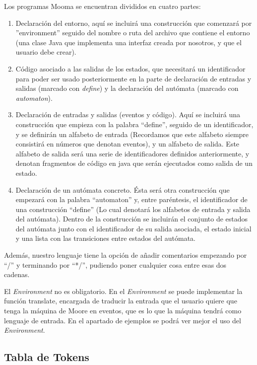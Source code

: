 \documentclass{pre-tfg}
\begin{document}
Los programas Mooma se encuentran divididos en cuatro partes: 
\begin{enumerate}
    \item Declaración del entorno, aquí se incluirá una construcción que comenzará por ''environment'' seguido del nombre o ruta del archivo que contiene el entorno (una clase Java que implementa una interfaz creada por nosotros, y que el usuario debe crear).
    \item  Código asociado a las salidas de los estados, que necesitará un identificador para poder ser usado posteriormente en la parte de declaración de entradas y salidas (marcado con \emph{define}) y la declaración del autómata (marcado con \emph{automaton}).
    \item Declaración de entradas y salidas (eventos y código). Aquí se incluirá una construcción que empieza con la palabra ``define'', seguido de un identificador, y se definirán un alfabeto de entrada (Recordamos que este alfabeto siempre consistirá en números que denotan eventos), y un alfabeto de salida. Este alfabeto de salida será una serie de identificadores definidos anteriormente, y denotan fragmentos de código en java que serán ejecutados como salida de un estado.
    \item Declaración de un autómata concreto. Ésta será otra construcción que empezará con la palabra ``automaton'' y, entre paréntesis, el identificador de una construcción “define” (Lo cual denotará los alfabetos de entrada y salida del autómata). Dentro de la construcción se incluirán el conjunto de estados del autómata junto con el identificador de su salida asociada, el estado inicial y una lista con las transiciones entre estados del autómata.
\end{enumerate}

Además, nuestro lenguaje tiene la opción de añadir comentarios empezando por ``\slash*'' y terminando por ``*\slash'', pudiendo poner cualquier cosa entre esas dos cadenas.

El \textit{Environment} no es obligatorio. En el \textit{Environment} se puede implementar la función translate, encargada de traducir la entrada que el usuario quiere que tenga la máquina de Moore en eventos, que es lo que la máquina tendrá como lenguaje de entrada. En el apartado de ejemplos se podrá ver mejor el uso del \textit{Environment}.

\subsection{Tabla de Tokens}
\end{document}
